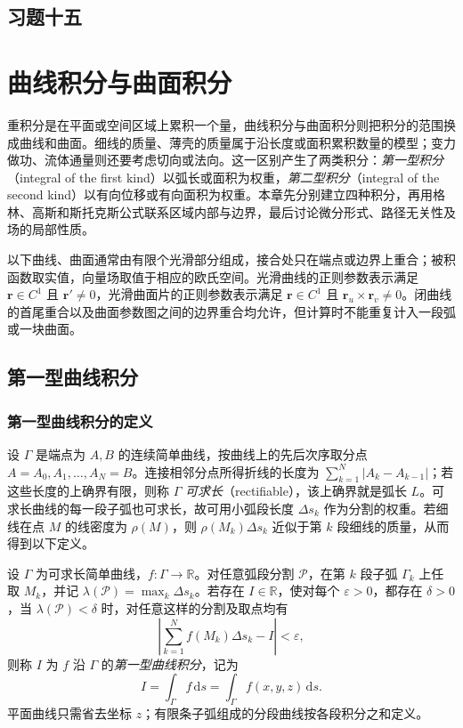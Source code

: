 \documentclass[UTF8,12pt,a4paper,fontset=fandol]{ctexbook}
\begin{document}
\section*{习题十五}

\chapter{曲线积分与曲面积分}
\label{chap:line-and-surface-integrals}

重积分是在平面或空间区域上累积一个量，曲线积分与曲面积分则把积分的范围换成曲线和曲面。细线的质量、薄壳的质量属于沿长度或面积累积数量的模型；变力做功、流体通量则还要考虑切向或法向。这一区别产生了两类积分：\emph{第一型积分}（integral of the first kind）以弧长或面积为权重，\emph{第二型积分}（integral of the second kind）以有向位移或有向面积为权重。本章先分别建立四种积分，再用格林、高斯和斯托克斯公式联系区域内部与边界，最后讨论微分形式、路径无关性及场的局部性质。

以下曲线、曲面通常由有限个光滑部分组成，接合处只在端点或边界上重合；被积函数取实值，向量场取值于相应的欧氏空间。光滑曲线的正则参数表示满足 $\boldsymbol r\in C^1$ 且 $\boldsymbol r'\neq0$，光滑曲面片的正则参数表示满足 $\boldsymbol r\in C^1$ 且 $\boldsymbol r_u\times\boldsymbol r_v\neq0$。闭曲线的首尾重合以及曲面参数图之间的边界重合均允许，但计算时不能重复计入一段弧或一块曲面。

\section{第一型曲线积分}
\label{sec:line-integrals-of-the-first-kind}

\subsection{第一型曲线积分的定义}
\label{subsec:definition-of-line-integrals-of-the-first-kind}

设 $\Gamma$ 是端点为 $A,B$ 的连续简单曲线，按曲线上的先后次序取分点 $A=A_0,A_1,\ldots,A_N=B$。连接相邻分点所得折线的长度为 $\sum_{k=1}^N|A_k-A_{k-1}|$；若这些长度的上确界有限，则称 $\Gamma$ \emph{可求长}（rectifiable），该上确界就是弧长 $L$。可求长曲线的每一段子弧也可求长，故可用小弧段长度 $\Delta s_k$ 作为分割的权重。若细线在点 $M$ 的线密度为 $\rho(M)$，则 $\rho(M_k)\Delta s_k$ 近似于第 $k$ 段细线的质量，从而得到以下定义。

\begin{definition}
\label{def:line-integral-first-kind}
设 $\Gamma$ 为可求长简单曲线，$f:\Gamma\to\mathbb R$。对任意弧段分割 $\mathcal P$，在第 $k$ 段子弧 $\Gamma_k$ 上任取 $M_k$，并记 $\lambda(\mathcal P)=\max_k\Delta s_k$。若存在 $I\in\mathbb R$，使对每个 $\varepsilon>0$，都存在 $\delta>0$，当 $\lambda(\mathcal P)<\delta$ 时，对任意这样的分割及取点均有
\[
    \left|\sum_{k=1}^N f(M_k)\Delta s_k-I\right|<\varepsilon,
\]
则称 $I$ 为 $f$ 沿 $\Gamma$ 的\emph{第一型曲线积分}，记为
\[
    I=\int_\Gamma f\,\mathrm ds
      =\int_\Gamma f(x,y,z)\,\mathrm ds.
\]
平面曲线只需省去坐标 $z$；有限条子弧组成的分段曲线按各段积分之和定义。
\end{definition}
\end{document}
